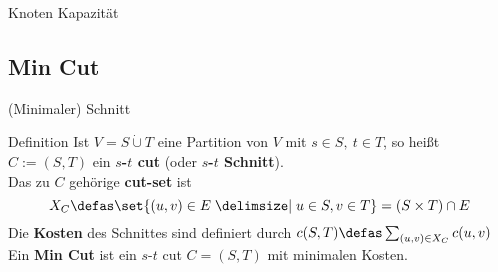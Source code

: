 \begin{frame}{Knoten Kapazität}
\begin{figure}
    \end{figure}
\end{frame}

\subsection{Min Cut}
\begin{frame}{(Minimaler) Schnitt}
    \begin{block}{Definition}
        \pause Ist \(V = S \dot{\cup} T\) eine Partition von \(V\) mit \(s \in S, \ t \in T\), so heißt \(C := (S, T)\) ein \textbf{$s$-$t$ cut} (oder \textbf{$s$-$t$ Schnitt}).\\\pause
        Das zu $C$ gehörige \textbf{cut-set} ist
        \[X_C \defas \set{(u, v) \in E \given u \in S, v \in T} = (S\times
        T)\cap E\]
        \pause
        Die \textbf{Kosten} des Schnittes sind definiert durch
        \(c(S, T) \defas \sum\nolimits_{(u, v) \in X_C} c(u, v)\)\\
        \pause Ein \textbf{Min Cut} ist ein $s$-$t$ cut \(C = (S, T)\) mit minimalen Kosten.
    \end{block}
\end{frame}

